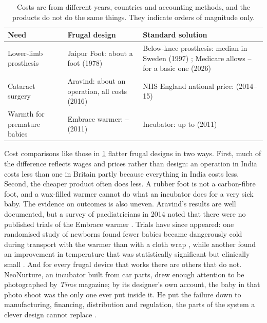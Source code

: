 \begin{table}[htbp]
\centering
\caption{ Costs are from different years,
countries and accounting methods, and the products do not do the same things.
They indicate orders of magnitude only.}
\label{tab:health-costs}
\small
\begin{tabularx}{\linewidth}{@{}l >{\raggedright\arraybackslash}X >{\raggedright\arraybackslash}X@{}}
\toprule
Need & Frugal design & Standard solution \\
\midrule
Lower-limb prosthesis & Jaipur Foot: about \jaipurCostOrig{} a foot (1978) \parencite{sethi1978} & Below-knee prosthesis: median \swedenProsthesisCost{} in Sweden (1997) \parencite{hermodsson1998}; Medicare allows \usProsthesisLow{}--\usProsthesisHigh{} for a basic one (2026) \parencite{cms2026dmepos} \\
Cataract surgery & Aravind: about \aravindCostPerOp{} an operation, all costs (2016) \parencite{le2016aravind} & NHS England national price: \nhsCataractTariff{} (2014--15) \parencite{monitor2014tariff} \\
Warmth for premature babies & Embrace warmer: \embraceCostLow{}--\embraceCostHigh{} (2011) \parencite{routson2011embrace} & Incubator: up to \incubatorCost{} (2011) \parencite{routson2011embrace} \\
\bottomrule
\end{tabularx}
\end{table}

\begin{counterpoint}
Cost comparisons like those in \cref{tab:health-costs} flatter frugal designs
in two ways. First, much of the difference reflects wages and prices rather
than design: an operation in India costs less than one in Britain partly
because everything in India costs less. Second, the cheaper product often does
less. A rubber foot is not a carbon-fibre foot, and a wax-filled warmer cannot
do what an incubator does for a very sick baby. The evidence on outcomes is
also uneven. Aravind's results are well documented, but a survey of
paediatricians in 2014 noted that there were no published trials of the
Embrace warmer \parencite{nimbalkar2014}. Trials have since appeared: one
randomised study of \embraceTrialSize{} newborns found fewer babies became
dangerously cold during transport with the warmer than with a cloth wrap
\parencite{morgaonkar2021}, while another found an improvement in temperature
that was statistically significant but clinically small
\parencite{gopalakrishnan2022}. And for every frugal device that works there
are others that do not. NeoNurture, an incubator built from car parts, drew
enough attention to be photographed by \emph{Time} magazine; by its designer's
own account, the baby in that photo shoot was the only one ever put inside it.
He put the failure down to manufacturing, financing, distribution and
regulation, the parts of the system a clever design cannot replace
\parencite{prestero2012ted}.
\end{counterpoint}
